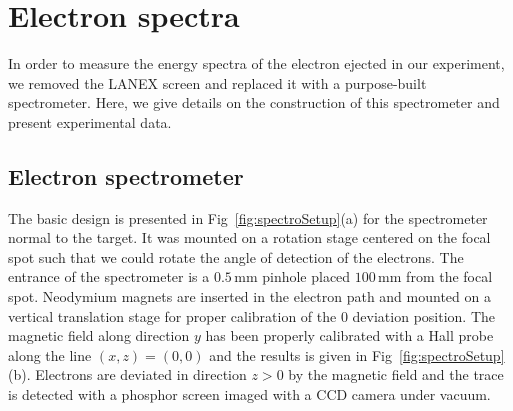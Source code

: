 %
%







\section{Electron spectra}\label{subsub:Spectral measurement}

In order to measure the energy spectra of the electron ejected in our experiment, we removed the LANEX screen and replaced it with a purpose-built spectrometer. Here, we give details on the construction of this spectrometer and present experimental data. 

\subsection{Electron spectrometer}

The basic design is presented in Fig~\ref{fig:spectroSetup}(a) for the spectrometer normal to the target. It was mounted on a rotation stage centered on the focal spot such that we could rotate the angle of detection of the electrons. The entrance of the spectrometer is a $0.5\,\mathrm{mm}$ pinhole placed $100\,\mathrm{mm}$ from the focal spot. Neodymium magnets are inserted in the electron path and mounted on a vertical translation stage for proper calibration of the $0$ deviation position. The magnetic field along direction $y$ has been properly calibrated with a Hall probe along the line $(x,z) = (0,0)$ and the results is given in Fig~\ref{fig:spectroSetup}(b). Electrons are deviated in direction $z>0$ by the magnetic field and the trace is detected with a phosphor screen imaged with a CCD camera under vacuum.

